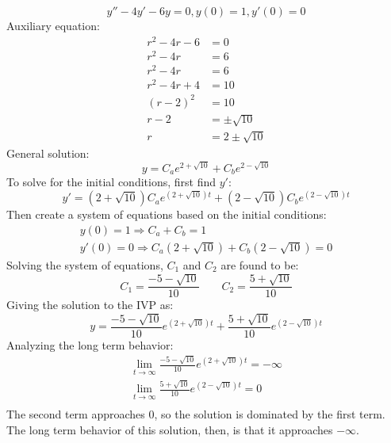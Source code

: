 \documentclass[12pt]{article}
\begin{document}
\begin{example}
  \begin{equation*}
    y'' - 4y' - 6y = 0, y(0) = 1, y'(0) = 0
  \end{equation*}
  Auxiliary equation:
  \begin{align*}
    r^2 - 4r - 6  &= 0  \\
    r^2 - 4r      &= 6  \\
    r^2 - 4r      &= 6 \\
    r^2 - 4r + 4  &= 10 \\
    (r-2)^2       &= 10 \\
    r-2           &= \pm \sqrt{10} \\
    r             &= 2 \pm \sqrt{10}
  \end{align*}
  General solution:
  \begin{equation*}
    y = C_ae^{2 + \sqrt{10}} + C_be^{2 - \sqrt{10}}
  \end{equation*}
  To solve for the initial conditions, first find $y'$:
  \begin{equation*}
    y' = (2 + \sqrt{10})C_ae^{(2 + \sqrt{10})t} + (2 - \sqrt{10})C_be^{(2 - \sqrt{10})t}
  \end{equation*}
  Then create a system of equations based on the initial conditions:
  \begin{gather*}
    y(0) = 1 \Rightarrow C_a + C_b = 1 \\
    y'(0) = 0 \Rightarrow C_a(2 + \sqrt{10}) + C_b(2 - \sqrt{10}) = 0
  \end{gather*}
  Solving the system of equations, $C_1$ and $C_2$ are found to be:
  \begin{equation*}
    C_1 = \frac{-5-\sqrt{10}}{10}\ \ \ \ \ \ \ \ \ C_2 = \frac{5+\sqrt{10}}{10}
  \end{equation*}
  Giving the solution to the IVP as:
  \begin{equation*}
    y = \frac{-5 - \sqrt{10}}{10}e^{(2 + \sqrt{10})t} + \frac{5 + \sqrt{10}}{10}e^{(2 - \sqrt{10})t}
  \end{equation*}
  Analyzing the long term behavior:
  \begin{gather*}
    \lim_{t \to \infty} \frac{-5 - \sqrt{10}}{10}e^{(2 + \sqrt{10})t} = -\infty \\
    \lim_{t \to \infty} \frac{5 + \sqrt{10}}{10}e^{(2 - \sqrt{10})t} = 0 \\
  \end{gather*}
  The second term approaches $0$, so the solution is dominated by the first term. The long term behavior of this solution, then, is that it approaches $-\infty$.
\end{example}
\end{document}
